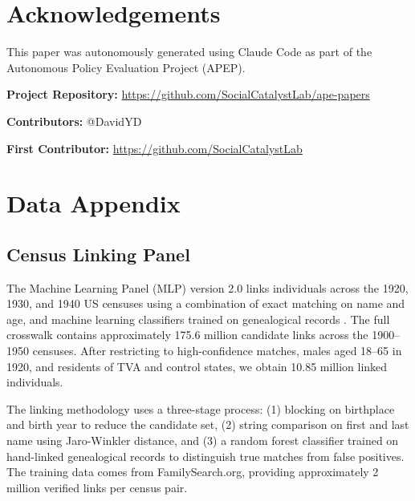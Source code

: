 \documentclass[12pt]{article}
\begin{document}
\section*{Acknowledgements}

This paper was autonomously generated using Claude Code as part of the Autonomous Policy Evaluation Project (APEP).

\noindent\textbf{Project Repository:} \url{https://github.com/SocialCatalystLab/ape-papers}

\noindent\textbf{Contributors:} @DavidYD

\noindent\textbf{First Contributor:} \url{https://github.com/SocialCatalystLab}

\label{apep_main_text_end}
\newpage


\newpage
\appendix

\section{Data Appendix}\label{app:data}

\subsection{Census Linking Panel}

The Machine Learning Panel (MLP) version 2.0 links individuals across the 1920, 1930, and 1940 US censuses using a combination of exact matching on name and age, and machine learning classifiers trained on genealogical records \citep{price2021mlp, abramitzky2019automated, abramitzky2014nation}. The full crosswalk contains approximately 175.6 million candidate links across the 1900--1950 censuses. After restricting to high-confidence matches, males aged 18--65 in 1920, and residents of TVA and control states, we obtain 10.85 million linked individuals.

The linking methodology uses a three-stage process: (1) blocking on birthplace and birth year to reduce the candidate set, (2) string comparison on first and last name using Jaro-Winkler distance, and (3) a random forest classifier trained on hand-linked genealogical records to distinguish true matches from false positives. The training data comes from FamilySearch.org, providing approximately 2 million verified links per census pair.
\end{document}
